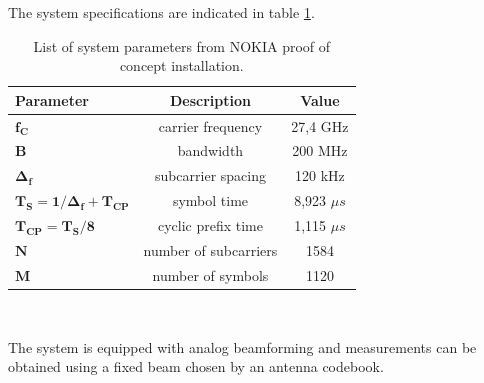 The system specifications are indicated in table \ref{table:PoCparams}.

\begin{table}[H]
	\centering 
	\begin{tabular}{|p{9em} c c |}
		\hline
		\rowcolor{bluepoli!40} %
		\textbf{Parameter} & \textbf{Description} & \textbf{Value}  \T\B \\
		\hline \hline
		$\bm{f_C}$ & carrier frequency & 27,4 GHz \T\B \\
		$\bm{B}$ & bandwidth & 200 MHz \T\B\\
		$\bm{\Delta_f}$ & subcarrier spacing & 120 kHz  \T\B\\
		$\bm{T_S = 1/\Delta_f + T_{CP}}$ & symbol time & 8,923 $\mu s$  \T\B\\
		$\bm{T_{CP} = T_S/8}$ & cyclic prefix time & 1,115 $\mu s$  \T\B\\
		$\bm{N}$ & number of subcarriers & 1584  \T\B\\
		$\bm{M}$ & number of symbols & 1120  \B\\
		
		\hline
	\end{tabular}
	\\[10pt]
	\caption{List of system parameters from NOKIA proof of concept installation.}
	\label{table:PoCparams}
\end{table}

The system is equipped with analog beamforming and measurements can be obtained using a fixed beam chosen by an antenna codebook.
